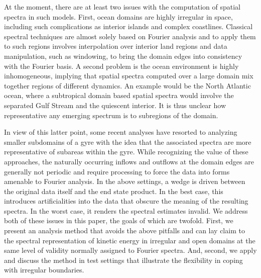 \documentclass[draft]{agujournal2019}
\begin{document}
At the moment, there are at least two issues with the computation of spatial spectra in such models. First, ocean domains are highly irregular in space, including such complications as interior islands and complex coastlines. Classical spectral techniques are almost solely based on Fourier analysis and to apply them to such regions involves interpolation over interior land regions and data manipulation, such as windowing, to bring the domain edges into consistency with the Fourier basis. A second problem is the ocean environment is highly inhomogeneous, implying that spatial spectra computed over a large domain mix together regions of different dynamics. An example would be the North Atlantic ocean, where a subtropical domain based spatial spectra would involve the separated Gulf Stream and the quiescent interior. It is thus unclear how representative any emerging spectrum is to subregions of the domain.

In view of this latter point, some recent analyses have resorted to analyzing smaller subdomains of a gyre with the idea that the associated spectra are more representative of subareas within the gyre. While recognizing the value of these approaches, the naturally occurring inflows and outflows at the domain edges are generally not periodic and require processing to force the data into forms amenable to Fourier analysis. In the above settings, a wedge is driven between the original data itself and the end state product. In the best case, this introduces artificialities into the data that obscure the meaning of the resulting spectra. In the worst case, it renders the spectral estimates invalid. We address both of these issues in this paper, the goals of which are twofold. First, we present an analysis method that avoids the above pitfalls and can lay claim to the spectral representation of kinetic energy in irregular and open domains at the same level of validity normally assigned to Fourier spectra. And, second, we apply and discuss the method in test settings that illustrate the flexibility in coping with irregular boundaries.
\end{document}
